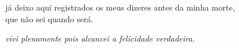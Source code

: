 já deixo aqui registrados os meus dizeres antes da minha morte,\\
que não sei quando será.

\emph{vivi plenamente pois alcancei a felicidade verdadeira.}
